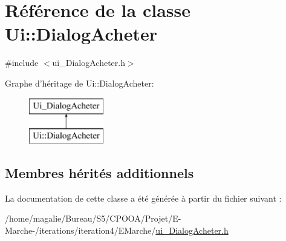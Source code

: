 \hypertarget{class_ui_1_1_dialog_acheter}{\section{Référence de la classe Ui\-:\-:Dialog\-Acheter}
\label{class_ui_1_1_dialog_acheter}
}


{\ttfamily \#include $<$ui\-\_\-\-Dialog\-Acheter.\-h$>$}

Graphe d'héritage de Ui\-:\-:Dialog\-Acheter\-:\begin{figure}[H]
\begin{center}
\leavevmode
\includegraphics[height=2.000000cm]{class_ui_1_1_dialog_acheter}
\end{center}
\end{figure}
\subsection*{Membres hérités additionnels}


La documentation de cette classe a été générée à partir du fichier suivant \-:\begin{DoxyCompactItemize}
\item 
/home/magalie/\-Bureau/\-S5/\-C\-P\-O\-O\-A/\-Projet/\-E-\/\-Marche-\//iterations/iteration4/\-E\-Marche/\hyperlink{ui___dialog_acheter_8h}{ui\-\_\-\-Dialog\-Acheter.\-h}\end{DoxyCompactItemize}
